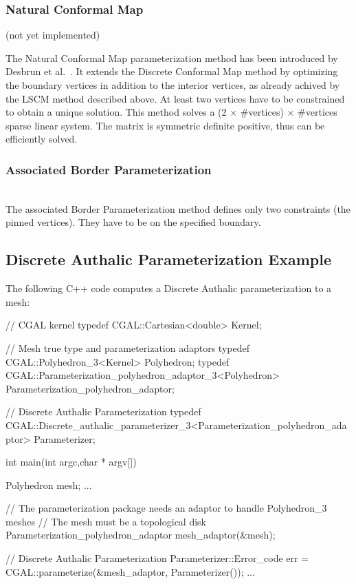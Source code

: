 \subsubsection{Natural Conformal Map}

(not yet implemented)

The Natural Conformal Map parameterization method has been introduced
by Desbrun et al.~\cite{cgal:dma-ipsm-02}. It extends the Discrete
Conformal Map method by optimizing the boundary vertices in addition
to the interior vertices, as already achived by the LSCM method
described above. At least two vertices have to be constrained to
obtain a unique solution. This method solves a (2 $\times$ \#vertices) $\times$
\#vertices sparse linear system.  The matrix is symmetric definite
positive, thus can be efficiently solved.



\subsubsection{Associated Border Parameterization}

  \\

The associated Border Parameterization method defines only two constraints
(the pinned vertices). They have to be on the specified boundary.


\subsection{Discrete Authalic Parameterization Example}

The following C++ code computes a Discrete Authalic parameterization
to a  mesh:

\begin{ccExampleCode}

// CGAL kernel
typedef CGAL::Cartesian<double>                         Kernel;

// Mesh true type and parameterization adaptors
typedef CGAL::Polyhedron_3<Kernel>                      Polyhedron;
typedef CGAL::Parameterization_polyhedron_adaptor_3<Polyhedron>
                                                        Parameterization_polyhedron_adaptor;

// Discrete Authalic Parameterization
typedef CGAL::Discrete_authalic_parameterizer_3<Parameterization_polyhedron_adaptor>
                                                        Parameterizer;

int main(int argc,char * argv[])
{
    Polyhedron mesh;
    ...

    // The parameterization package needs an adaptor to handle Polyhedron_3 meshes
    // The mesh must be a topological disk
    Parameterization_polyhedron_adaptor mesh_adaptor(&mesh);

    // Discrete Authalic Parameterization
    Parameterizer::Error_code err = CGAL::parameterize(&mesh_adaptor, Parameterizer());
    ...
}

\end{ccExampleCode}

